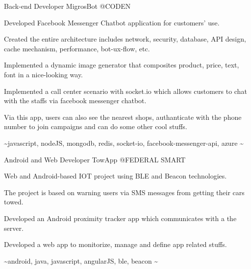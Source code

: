 \begin{cventries}
  \cventry
    {Back-end Developer} %
    {MigrosBot} %
    {@CODEN} %
    {}
    {
      \begin{cvitems} %
        \item {Developed Facebook Messenger Chatbot application for customers' use.}
        \item {Created the entire architecture includes network, security, database, API design, cache mechanism, performance, bot-ux-flow, etc.}
        \item {Implemented a dynamic image generator that composites product, price, text, font in a nice-looking way.}
        \item {Implemented a call center scenario with socket.io which allows customers to chat with the staffs via facebook messenger chatbot.}
        \item {Via this app, users can also see the nearest shops, authanticate with the phone number to join campaigns and can do some other cool stuffs.}
        \item {\textasciitilde javascript, nodeJS, mongodb, redis, socket-io, facebook-messenger-api, azure \textasciitilde}
      \end{cvitems}
    }

  \cventry
    {Android and Web Developer} %
    {TowApp} %
    {@FEDERAL SMART} %
    {}
    {
      \begin{cvitems} %
        \item {Web and Android-based IOT project using BLE and Beacon technologies.}
        \item {The project is based on warning users via SMS messages from getting their cars towed.}
        \item {Developed an Android proximity tracker app which communicates with a the server.}
        \item {Developed a web app to monitorize, manage and define app related stuffs.}
        \item {\textasciitilde android, java, javascript, angularJS, ble, beacon \textasciitilde}
      \end{cvitems}
    }


\end{cventries}
